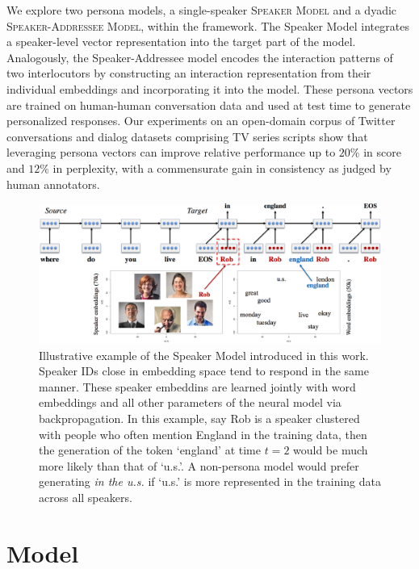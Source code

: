 We explore two persona models, a single-speaker \textsc{Speaker Model} and a dyadic \textsc{Speaker-Addressee Model}, within the \sts framework. 
The Speaker Model integrates a speaker-level vector representation into the target part of the \sts model.
Analogously, the Speaker-Addressee model encodes the interaction patterns of two interlocutors by constructing an interaction representation from their individual embeddings and incorporating it into the \sts model. 
These persona vectors are trained on human-human conversation data and used at test time to generate personalized responses.
Our experiments on an open-domain corpus of Twitter conversations and dialog datasets comprising TV series scripts show that leveraging persona vectors can improve relative performance up to $20\%$ in \bleu score and $12\%$ in perplexity, with a commensurate gain in consistency as judged by human annotators. 





\begin{figure} [!ht]
\centering
\includegraphics[width=6in]{img/persona.png}
\caption[The persona speaker model]{Illustrative example of the Speaker Model introduced in this work. Speaker IDs close in embedding space tend to respond in the same manner. These speaker embeddins are learned jointly with word embeddings and all other parameters of the neural model via backpropagation. %
In this example, say Rob is a speaker clustered with people who often mention England in the training data, then the generation of the token `england' at time \mbox{$t=2$} would be much more likely than that of `u.s.'. A non-persona model would prefer generating {\it in the u.s.} if `u.s.' is more represented in the training data across all speakers.
}\label{fig1}
\end{figure}

\section{Model}
